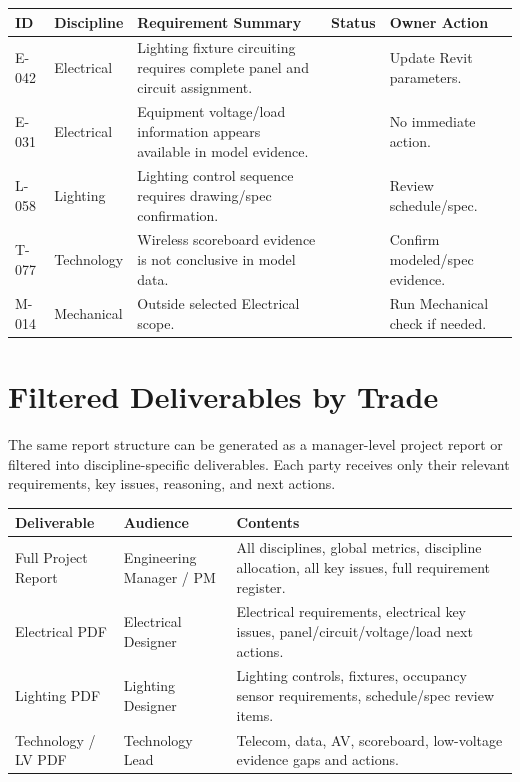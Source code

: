 \documentclass[10pt,letterpaper]{article}
\newcommand{\badge}[3]{\tcbox[on line,colback=#2,colframe=#2,boxrule=0pt,arc=2mm,left=5pt,right=5pt,top=2pt,bottom=2pt]{\scriptsize\textbf{\textcolor{#3}{#1}}}}
\newcommand{\metbadge}{\badge{Met}{emaGreenBg}{emaGreen}}
\newcommand{\notmetbadge}{\badge{Not Met}{emaRedBg}{emaRed}}
\newcommand{\reviewbadge}{\badge{Needs Human Review}{emaAmberBg}{emaAmber}}
\newcommand{\insufficientbadge}{\badge{Insufficient Model Data}{emaPurpleBg}{emaPurple}}
\newcommand{\nabadge}{\badge{Not Applicable}{emaGrayBg}{emaSlate}}
\begin{document}
\begin{tcolorbox}
\begin{tabularx}{\textwidth}{p{0.65in}p{1.05in}Xp{1.25in}p{1.2in}}
\toprule
\textbf{ID} & \textbf{Discipline} & \textbf{Requirement Summary} & \textbf{Status} & \textbf{Owner Action} \\
\midrule
E-042 & Electrical & Lighting fixture circuiting requires complete panel and circuit assignment. & \notmetbadge & Update Revit parameters. \\
E-031 & Electrical & Equipment voltage/load information appears available in model evidence. & \metbadge & No immediate action. \\
L-058 & Lighting & Lighting control sequence requires drawing/spec confirmation. & \reviewbadge & Review schedule/spec. \\
T-077 & Technology & Wireless scoreboard evidence is not conclusive in model data. & \insufficientbadge & Confirm modeled/spec evidence. \\
M-014 & Mechanical & Outside selected Electrical scope. & \nabadge & Run Mechanical check if needed. \\
\bottomrule
\end{tabularx}
\end{tcolorbox}

\section*{Filtered Deliverables by Trade}

\begin{tcolorbox}[colback=emaSoft]
The same report structure can be generated as a manager-level project report or filtered into discipline-specific deliverables. Each party receives only their relevant requirements, key issues, reasoning, and next actions.
\end{tcolorbox}

\begin{tcolorbox}
\begin{tabularx}{\textwidth}{p{1.6in}p{1.35in}X}
\toprule
\textbf{Deliverable} & \textbf{Audience} & \textbf{Contents} \\
\midrule
Full Project Report & Engineering Manager / PM & All disciplines, global metrics, discipline allocation, all key issues, full requirement register. \\
Electrical PDF & Electrical Designer & Electrical requirements, electrical key issues, panel/circuit/voltage/load next actions. \\
Lighting PDF & Lighting Designer & Lighting controls, fixtures, occupancy sensor requirements, schedule/spec review items. \\
Technology / LV PDF & Technology Lead & Telecom, data, AV, scoreboard, low-voltage evidence gaps and actions. \\
\bottomrule
\end{tabularx}
\end{tcolorbox}
\end{document}
